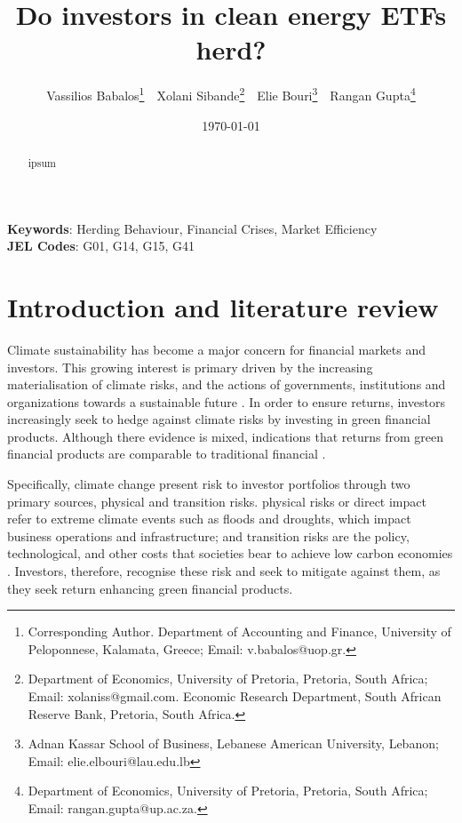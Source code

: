 \documentclass[
  letterpaper,
  DIV=11,
  numbers=noendperiod]{scrartcl}
\author{}
\date{}
\begin{document}
\title{Do investors in clean energy ETFs herd?}



\author { 
Vassilios Babalos\footnote{Corresponding Author. Department of Accounting and Finance, University of Peloponnese, Kalamata,  Greece; Email: v.babalos@uop.gr.} \,\,
Xolani Sibande\footnote{Department of Economics, University of Pretoria, Pretoria, South Africa; Email: xolaniss@gmail.com. Economic Research Department, South African Reserve Bank, Pretoria, South Africa.} \,\, 
Elie Bouri\footnote{Adnan Kassar School of Business, Lebanese American University, Lebanon; Email: elie.elbouri@lau.edu.lb} \,\,
Rangan Gupta\footnote{Department of Economics, University of Pretoria, Pretoria, South Africa; Email: rangan.gupta@up.ac.za.} 
}
\date{\today}
\maketitle

\begin{abstract}

ipsum

\end{abstract}

\noindent\textbf{Keywords}: Herding Behaviour, Financial Crises, Market Efficiency
\\
\textbf{JEL Codes}: G01, G14, G15, G41
\newpage

\section{Introduction and literature
review}\label{introduction-and-literature-review}

Climate sustainability has become a major concern for financial markets
and investors. This growing interest is primary driven by the increasing
materialisation of climate risks, and the actions of governments,
institutions and organizations towards a sustainable future
\citep{giglio2021a}. In order to ensure returns, investors increasingly
seek to hedge against climate risks by investing in green financial
products. Although there evidence is mixed, indications that returns
from green financial products are comparable to traditional financial
\citetext{\citealp[see amongst
others,][]{decclesia2024}; \citealp{nguyen2025}; \citealp{pastor2022}; \citealp[and][]{naqvi2022}}.

Specifically, climate change present risk to investor portfolios through
two primary sources, physical and transition risks. physical risks or
direct impact refer to extreme climate events such as floods and
droughts, which impact business operations and infrastructure; and
transition risks are the policy, technological, and other costs that
societies bear to achieve low carbon economies
\citetext{\citealp{nguyen2025}; \citealp[and][ amongst
others]{giglio2021a}}. Investors, therefore, recognise these risk and
seek to mitigate against them, as they seek return enhancing green
financial products.
\end{document}
